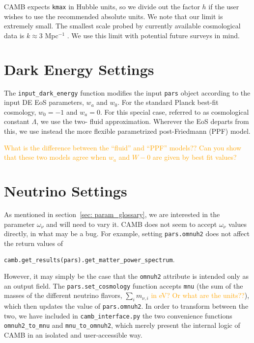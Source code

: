 CAMB expects \verb|kmax| in Hubble units, so we divide out the factor $h$ if 
the user wishes to use the recommended absolute units.
We note that our limit is extremely small. The smallest scale probed by
currently available cosmological data is $k \approx 3$ Mpc$^{-1}$
. We use this limit with potential future surveys in mind.


\section{Dark Energy Settings}

The \verb|input_dark_energy| function modifies the input \verb|pars| object
according to the input DE EoS parameters, $w_a$ and $w_0$. For the standard
Planck best-fit cosmology, $w_0 = -1$ and $w_a = 0$. For this special case,
referred to as cosmological constant $\Lambda$, we use the two-
fluid approximation. Wherever the EoS departs from this, we use instead the
more flexible parametrized post-Friedmann (PPF) model.

\textcolor{orange}{What is the difference between the ``fluid'' and ``PPF''
models?? Can you show that these two models agree when $w_a$ and $W-0$ are
given by best fit values?}

\section{Neutrino Settings}


As mentioned in section~\ref{sec: param_glossary}, we are interested in the
parameter $\omega_\nu$ and will need to vary it. CAMB does not seem to accept
$\omega_\nu$ values directly, in what may be a bug. For example, setting
\verb|pars.omnuh2| does not affect the return values of

\verb|camb.get_results(pars).get_matter_power_spectrum|.

However, it may simply be the case that the \verb|omnuh2| attribute is
intended only as an output field. The \verb|pars.set_cosmology| function
accepts \verb|mnu| (the sum of the masses of the different neutrino flavors,
$\sum_i m_{\nu, i}$ \textcolor{orange}{in eV? Or what are the units??}),
which then updates the value of \verb|pars.omnuh2|.
In order to transform between the two, we have included in
\verb|camb_interface.py| the two convenience functions
\verb|omnuh2_to_mnu| and \verb|mnu_to_omnuh2|, which merely present the 
internal logic of CAMB in an isolated and user-accessible way.

